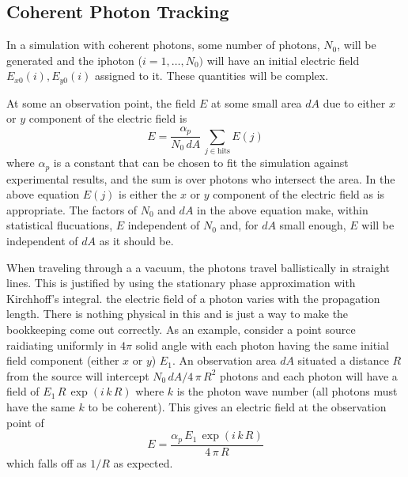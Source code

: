 \subsection{Coherent Photon Tracking}

In a simulation with coherent photons, some number of photons,
$N_0$, will be generated and the i\Th photon ($i = 1, \ldots, N_0)$
will have an initial electric field $E_{x0}(i), E_{y0}(i)$ assigned to
it. These quantities will be complex.

At some an observation point, the field $E$ at
some small area $dA$ due to either $x$ or $y$ component of the
electric field is
\begin{equation}
  E = \frac{\alpha_p}{N_0 \, dA} \, \sum_{j \in \text{hits}} E(j)
  \label{panda2}
\end{equation}
where $\alpha_p$ is a constant that can be chosen to fit the
simulation against experimental results, and the sum is over photons
who intersect the area. In the above equation $E(j)$ is either the $x$
or $y$ component of the electric field as is appropriate. The factors
of $N_0$ and $dA$ in the above equation make, within statistical
flucuations, $E$ independent of $N_0$ and, for $dA$ small enough, $E$
will be independent of $dA$ as it should be.

When traveling through a a vacuum, the photons travel ballistically in
straight lines. This is justified by using the stationary phase
approximation with Kirchhoff's integral. the electric field of a
photon varies with the propagation length. There is nothing physical
in this and is just a way to make the bookkeeping come out
correctly. As an example, consider a point source raidiating uniformly
in $4\pi$ solid angle with each photon having the same initial field
component (either $x$ or $y$) $E_1$.  An observation area $dA$
situated a distance $R$ from the source will intercept $N_0 \, dA / 4
\, \pi \, R^2$ photons and each photon will have a field of $E_1 \, R
\, \exp(i \, k \, R)$ where $k$ is the photon wave number (all photons
must have the same $k$ to be coherent). This gives an electric field
at the observation point of
\begin{equation}
  E = \frac{\alpha_p \, E_1 \, \exp(i \, k \, R)}{4 \, \pi \, R}
\end{equation}
which falls off as $1/R$ as expected.


